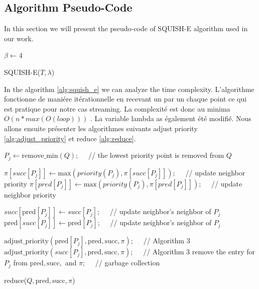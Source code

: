 \documentclass[twoside,12pt, a4paper]{report}
\begin{document}
\subsection{Algorithm Pseudo-Code}
In this section we will present the pseudo-code of SQUISH-E algorithm used in our work. \\

\begin{algorithm}[H]
	\DontPrintSemicolon
	$\beta \gets 4$ 
	\caption{SQUISH-E($T, \lambda$)}
	\label{alg:squish_e}
\end{algorithm}

In the algorithm \ref{alg:squish_e} we can analyze the time complexity. L'algorithme fonctionne de maniére itérationnelle en recevant un par un chaque point ce qui est pratique pour notre cas streaming. La complexité est donc au minima $O(n * max(O(loop) ))$ . La variable lambda as également été modifié. Nous allons ensuite présenter les algorithmes suivants adjust priority \ref{alg:adjust_priority} et reduce \ref{alg:reduce}. 


\begin{algorithm}[H]
	\DontPrintSemicolon
	
	$P_j \gets \text{remove\_min}(Q); \quad$ // the lowest priority point is removed from $Q$\;
	
	$\pi[succ[P_j]] \gets \text{max}(priority(P_j) , \pi[succ[P_j]]); \quad$  // update neighbor priority\;
	$\pi[pred[P_j]] \gets \text{max}(priority(P_j) , \pi[pred[P_j]]); \quad$ // update neighbor priority\;
	
	
	$succ[\text{pred}[P_j]] \gets succ[P_j]; \quad$ // update neighbor's neighbor of $P_j$ \;
	$\text{pred}[succ[P_j]] \gets \text{pred}[P_j]; \quad$ // update neighbor's neighbor of $P_j$ \;
	
	
	$\text{adjust\_priority}(\text{pred}[P_j], \text{pred}, \text{succ}, \pi); \quad$ // Algorithm 3\;
	$\text{adjust\_priority}(succ[P_j], \text{pred}, \text{succ}, \pi); \quad$ // Algorithm 3\;
	remove the entry for $P_j$ from $\text{pred}, \text{succ},$ and $\pi; \quad$ // garbage collection\;
	
	\caption{reduce($Q, \text{pred}, \text{succ}, \pi$)}
	\label{alg:reduce}
\end{algorithm}
\end{document}
